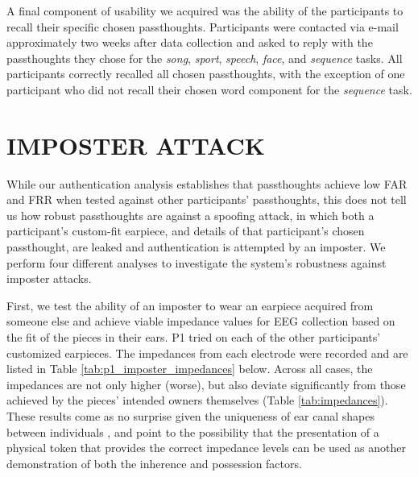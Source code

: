 \documentclass[a4paper,twoside]{article}
\begin{document}
A final component of usability we acquired was the ability of the participants to recall their specific chosen passthoughts. Participants were contacted via e-mail approximately two weeks after data collection and asked to reply with the passthoughts they chose for the \textit{song}, \textit{sport}, \textit{speech}, \textit{face}, and \textit{sequence} tasks. All participants correctly recalled all chosen passthoughts, with the exception of one participant who did not recall their chosen word component for the \textit{sequence} task.

\section{\uppercase{Imposter Attack}}
\label{sec:imposterattack}

\noindent While our authentication analysis establishes that passthoughts achieve low FAR and FRR when tested against other participants' passthoughts, this does not tell us how robust passthoughts are against a spoofing attack, in which both a participant's custom-fit earpiece, and details of that participant's chosen passthought, are leaked and authentication is attempted by an imposter. We perform four different analyses to investigate the system's robustness against imposter attacks.

First, we test the ability of an imposter to wear an earpiece acquired from someone else and achieve viable impedance values for EEG collection based on the fit of the pieces in their ears. P1 tried on each of the other participants' customized earpieces. The impedances from each electrode were recorded and are listed in Table \ref{tab:p1_imposter_impedances} below. Across all cases, the impedances are not only higher (worse), but also deviate significantly from those achieved by the pieces' intended owners themselves (Table \ref{tab:impedances}). These results come as no surprise given the uniqueness of ear canal shapes between individuals \cite{Akkermans2005}, and point to the possibility that the presentation of a physical token that provides the correct impedance levels can be used as another demonstration of both the inherence and possession factors.
\end{document}
